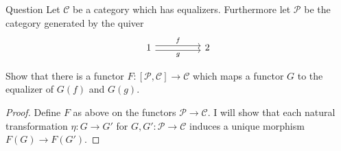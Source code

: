 \documentclass{article}
\newcommand{\cat}{\mathcal{C}}
\newcommand{\pcat}{\mathcal{P}}
\newenvironment{question}[1][]{\begin{paragraph}{Question #1}}{\end{paragraph}}
\theoremstyle{definition}
\begin{document}
\begin{question}
    Let \(\cat\) be a category which has equalizers. Furthermore let \(\pcat\)
    be the category generated by the quiver
    \[
        \begin{tikzcd}[ampersand replacement=\&]
            1 \&\& 2
            \arrow["f", shift left=1, from=1-1, to=1-3]
            \arrow["g"',shift right=1, from=1-1, to=1-3]
        \end{tikzcd}
    \]

    Show that there is a functor \(F:[\pcat,\cat]\to\cat\) which maps a functor
    \(G\) to the equalizer of \(G(f)\) and \(G(g)\).

    \begin{proof}
        Define \(F\) as above on the functors \(\pcat\to\cat\). I will show that
        each natural transformation \(\eta:G\to G'\) for \(G,G':\pcat\to\cat\)
        induces a unique morphism \(F(G)\to F(G')\).


\end{proof}
\end{question}
\end{document}
